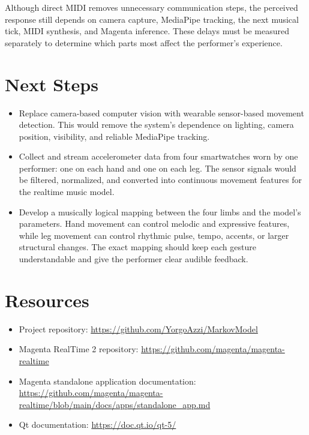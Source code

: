 \documentclass[11pt,a4paper]{article}
\begin{document}
Although direct MIDI removes unnecessary communication steps, the perceived
response still depends on camera capture, MediaPipe tracking, the next musical
tick, MIDI synthesis, and Magenta inference. These delays must be measured
separately to determine which parts most affect the performer's experience.

\section{Next Steps}

\begin{itemize}
    \item Replace camera-based computer vision with wearable sensor-based
    movement detection. This would remove the system's dependence on lighting,
    camera position, visibility, and reliable MediaPipe tracking.
    \item Collect and stream accelerometer data from four smartwatches worn by
    one performer: one on each hand and one on each leg. The sensor signals
    would be filtered, normalized, and converted into continuous movement
    features for the realtime music model.
    \item Develop a musically logical mapping between the four limbs and the
    model's parameters. Hand movement can control melodic and expressive
    features, while leg movement can control rhythmic pulse, tempo, accents,
    or larger structural changes. The exact mapping should keep each gesture
    understandable and give the performer clear audible feedback.
\end{itemize}

\section{Resources}

\begin{itemize}
    \item Project repository:
    \url{https://github.com/YorgoAzzi/MarkovModel}
    \item Magenta RealTime 2 repository:
    \url{https://github.com/magenta/magenta-realtime}
    \item Magenta standalone application documentation:
    \url{https://github.com/magenta/magenta-realtime/blob/main/docs/apps/standalone_app.md}
    \item Qt documentation:
    \url{https://doc.qt.io/qt-5/}
\end{itemize}
\end{document}
